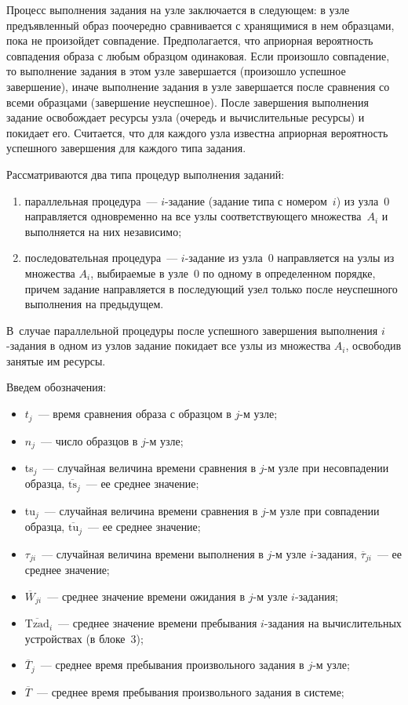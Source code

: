 \begin{multicols}{2}
Процесс выполнения задания на узле заключается в следующем: в узле
предъявленный образ поочеред\-но сравнивается с хранящимися в нем
образцами, пока не произойдет совпадение. Предполагается, что априорная
вероятность совпадения образа с любым образцом одинаковая. Если произошло
совпадение, то выполнение задания в этом узле завершается (произошло
успешное завершение), иначе выполнение задания в узле завершается после
сравнения со всеми образцами (завершение неуспешное). После завершения
выполнения задание освобождает ресурсы узла (очередь и вычислительные
ресурсы) и покидает его. Считается, что для каждого узла известна априорная
вероятность успешного завершения для каждого типа задания.

Рассматриваются два типа процедур выполнения заданий:
\begin{enumerate}[(1)]
\item %
параллельная
процедура~--- %
$i$-за\-да\-ние (задание типа с номером~$i$) из узла~0
на\-прав\-ля\-ет\-ся одновременно на все узлы со\-от\-вет\-ст\-ву\-юще\-го множества~$A_i$ и
выполняется на них независимо;
\item %
последовательная процедура~---
$i$-за\-да\-ние из узла~0 направляется на узлы из множества $A_i$,
выбираемые в узле~0 по одному в определенном порядке, причем задание
направляется в последующий узел только после неуспешного выполнения на
предыдущем.
\end{enumerate}

В~случае параллельной процедуры после успешного завершения
выполнения $i$-за\-да\-ния в одном из узлов задание покидает все узлы из
множества $A_i$, освободив занятые им ресурсы.

Введем обозначения:
\begin{itemize}
\item $t_j$~--- время сравнения образа с образцом в $j$-м узле;
\item
$n_j$~--- число образцов в $j$-м узле;
\item
ts$_j$~--- случайная величина времени сравнения в $j$-м узле при
несовпадении образца, $\overline{\mbox{ts}}_j$~--- ее среднее значение;
\item
tu$_j$~--- случайная величина времени сравнения в $j$-м узле при совпадении
образца, $\overline{\mbox{tu}}_j$~--- ее среднее значение;
\item
$\tau_{ji}$~--- случайная величина времени выполнения в $j$-м узле
$i$-за\-да\-ния, $\overline{\tau}_{ji}$~--- ее среднее значение;
\item
$\overline{W}_{ji}$~--- среднее значение времени ожидания в $j$-м узле
$i$-за\-да\-ния;
\item
$\overline{\mbox{Tzad}}_i$~--- среднее значение времени пребывания $i$-за\-да\-ния на
вычислительных устройствах (в блоке~3);
\item
$\overline{T}_j$~--- среднее время пребывания произвольного задания в $j$-м
узле;
\item
$\overline{T}$~--- среднее время пребывания произвольного задания в системе;


\end{itemize}
\end{multicols}
